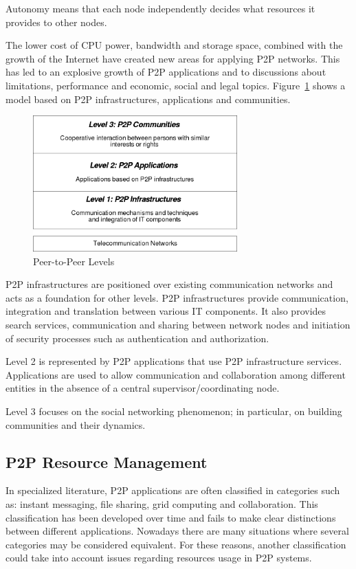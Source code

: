 Autonomy means that each node independently decides what resources it provides
to other nodes.

The lower cost of CPU power, bandwidth and storage space, combined with
the growth of the Internet have created new areas for applying P2P networks.
This has led to an explosive growth of P2P applications and to discussions about
limitations, performance and economic, social and legal topics.
Figure~\ref{fig:p2p-systems:p2p-levels} shows a model based on P2P
infrastructures, applications and communities.

\begin{figure}
  \centering
  \includegraphics[width=0.7\textwidth]{src/img/p2p-systems/p2p-levels}
  \caption{Peer-to-Peer Levels}
  \label{fig:p2p-systems:p2p-levels}
\end{figure}

P2P infrastructures are positioned over existing communication networks and
acts as a foundation for other levels. P2P infrastructures provide
communication, integration and translation between various IT components. It
also provides search services, communication and sharing between network
nodes and initiation of security processes such as authentication and
authorization.

Level 2 is represented by P2P applications that use P2P infrastructure
services. Applications are used to allow communication and collaboration
among different entities in the absence of a central supervisor/coordinating
node.

Level 3 focuses on the social networking phenomenon; in particular, on
building communities and their dynamics.

\subsection{P2P Resource Management}

In specialized literature, P2P applications are often classified in categories
such as: instant messaging, file sharing, grid computing and collaboration.
This classification has been developed over time and fails to make clear
distinctions between different applications. Nowadays there are many
situations where several categories may be considered equivalent. For these
reasons, another classification could take into account issues regarding
resources usage in P2P systems.

